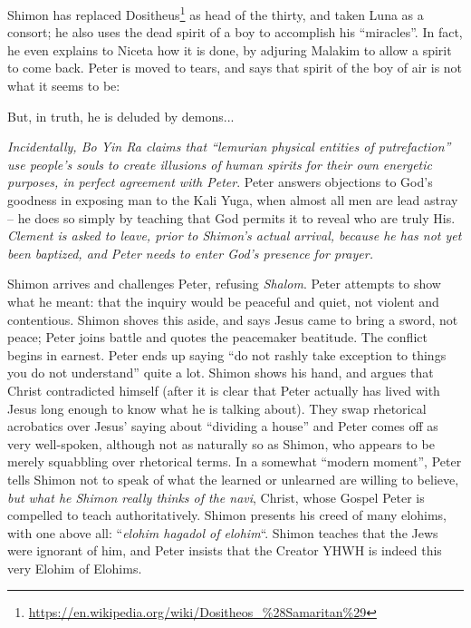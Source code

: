 Shimon has replaced Dositheus\footnote{\url{https://en.wikipedia.org/wiki/Dositheos\_\%28Samaritan\%29}} as head of the thirty, and taken Luna as a consort; he also uses the dead spirit of a boy to accomplish his ``miracles''. In fact, he even explains to Niceta how it is done, by adjuring Malakim to allow a spirit to come back. Peter is moved to tears, and says that spirit of the boy of air is not what it seems to be:

\begin{quotex}
But, in truth, he is deluded by demons...
\end{quotex}


\emph{Incidentally, Bo Yin Ra claims that ``lemurian physical entities of putrefaction'' use people's souls to create illusions of human spirits for their own energetic purposes, in perfect agreement with Peter}. Peter answers objections to God's goodness in exposing man to the Kali Yuga, when almost all men are lead astray -- he does so simply by teaching that God permits it to reveal who are truly His. \emph{Clement is asked to leave, prior to Shimon's actual arrival, because he has not yet been baptized, and Peter needs to enter God's presence for prayer.}

Shimon arrives and challenges Peter, refusing \emph{Shalom}. Peter attempts to show what he meant: that the inquiry would be peaceful and quiet, not violent and contentious. Shimon shoves this aside, and says Jesus came to bring a sword, not peace; Peter joins battle and quotes the peacemaker beatitude. The conflict begins in earnest. Peter ends up saying ``do not rashly take exception to things you do not understand'' quite a lot. Shimon shows his hand, and argues that Christ contradicted himself (after it is clear that Peter actually has lived with Jesus long enough to know what he is talking about). They swap rhetorical acrobatics over Jesus' saying about ``dividing a house'' and Peter comes off as very well-spoken, although not as naturally so as Shimon, who appears to be merely squabbling over rhetorical terms. In a somewhat ``modern moment'', Peter tells Shimon not to speak of what the learned or unlearned are willing to believe, \emph{but what he Shimon really thinks of the navi}, Christ, whose Gospel Peter is compelled to teach authoritatively. Shimon presents his creed of many elohims, with one above all: ``\emph{elohim hagadol of elohim}``. Shimon teaches that the Jews were ignorant of him, and Peter insists that the Creator YHWH is indeed this very Elohim of Elohims.

